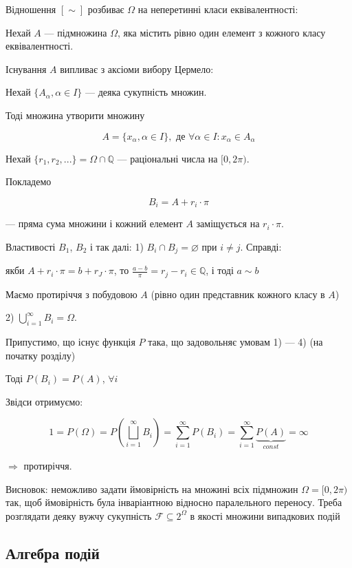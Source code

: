 Відношення $[\sim]$ розбиває $\Omega$ на неперетинні
класи еквівалентності:

Нехай $A$ --- підмножина $\Omega$, яка містить рівно
один елемент з кожного класу еквівалентності.

Існування $A$ випливає з аксіоми вибору Цермело:

Нехай $\{A_{\alpha}, \alpha \in I\}$ --- деяка сукупність множин.

Тоді множина утворити множину

$$A = \{x_{\alpha}, \alpha \in I\}, \text{ де } \forall \alpha \in I: x_{\alpha} \in A_{\alpha}$$

Нехай $\{ r_1, r_2, ... \} = \Omega \cap \mathbb{Q}$ --- раціональні числа на $[0, 2\pi)$.

Покладемо

$$B_i = A + r_i \cdot \pi$$

--- пряма сума множини і кожний елемент $A$ заміщується на $r_i \cdot \pi$.

Властивості $B_1$, $B_2$ і так далі:
1) $B_i \cap B_j = \varnothing$ при $i \neq j$. Справді:

якби $ A + r_i \cdot \pi = b + r_J \cdot \pi$,
то $\frac{a-b}{\pi} = r_j - r_i \in \mathbb{Q}$,
і тоді $a \sim b$ 

Маємо протиріччя з побудовою $A$ (рівно один представник кожного класу в $A$)

2) $\bigcup\limits_{i=1}^{\infty} B_i = \Omega$.

Припустимо, що існує функція $P$ така, що задовольняє умовам 1) --- 4) (на початку розділу)

Тоді $P(B_i) = P(A)$, $\forall i$

Звідси отримуємо:

\begin{equation}
    1 = P(\Omega)
    = P(\bigsqcup\limits_{i=1}^{\infty} B_i)
    = \sum\limits_{i=1}^{\infty} P(B_i)
    = \sum\limits_{i=1}^{\infty} \underbrace{P(A)}_{const}
    = \infty
\end{equation}

$\Rightarrow$ протиріччя.

Висновок: неможливо задати ймовірність на множині всіх підмножин
$\Omega = [0, 2\pi)$ так, щоб ймовірність була інваріантною
відносно паралельного переносу. Треба розглядати деяку вужчу
сукупність $\mathcal{F} \subseteq 2^{\Omega}$ в якості множини
випадкових подій

\subsection{Алгебра подій}

